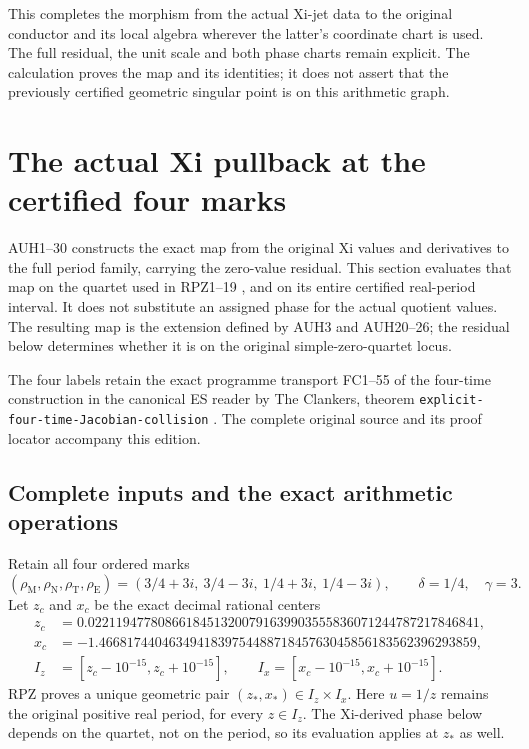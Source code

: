 \documentclass[11pt]{article}
\begin{document}
This completes the morphism from the actual Xi-jet data to the
original conductor and its local algebra wherever the latter's
coordinate chart is used.  The full residual, the unit scale and
both phase charts remain explicit.  The calculation proves the
map and its identities; it does not assert that the previously
certified geometric singular point is on this arithmetic graph.

\section{The actual Xi pullback at the certified four marks}
\label{sec:actual-xi-certificate}

AUH1--30 constructs the exact map from the original Xi values and
derivatives to the full period family, carrying the zero-value residual.
This section evaluates that map on the quartet used in RPZ1--19
\cite{RPZ005}, and on its entire certified real-period interval.
It does not substitute an assigned phase for the actual quotient values.
The resulting map is the extension defined by AUH3 and AUH20--26;
the residual below determines whether it is on the original
simple-zero-quartet locus.

The four labels retain the exact programme transport FC1--55 of the
four-time construction in the canonical ES reader by The Clankers,
theorem \texttt{explicit-four-time-Jacobian-collision} \cite{ES488}.
The complete original source and its proof locator accompany this edition.

\subsection{Complete inputs and the exact arithmetic operations}

Retain all four ordered marks
\[
 (\rho_{\mathrm M},\rho_{\mathrm N},\rho_{\mathrm T},\rho_{\mathrm E})
 =(3/4+3i,\ 3/4-3i,\ 1/4+3i,\ 1/4-3i),\qquad
 \delta=1/4,\quad\gamma=3.
 \tag{RXT1}
\]
Let $z_c$ and $x_c$ be the exact decimal rational centers
\[
\begin{aligned}
 z_c&=0.02211947780866184513200791639903555836071244787217846841,\\
 x_c&=-1.466817440463494183975448871845763045856183562396293859,\\
 I_z&=[z_c-10^{-15},z_c+10^{-15}],\qquad
 I_x=[x_c-10^{-15},x_c+10^{-15}].
\end{aligned}\tag{RXT2}
\]
RPZ proves a unique geometric pair $(z_*,x_*)\in I_z\times I_x$.
Here $u=1/z$ remains the original positive real period, for every
$z\in I_z$. The Xi-derived phase below depends on the quartet,
not on the period, so its evaluation applies at $z_*$ as well.
\end{document}
